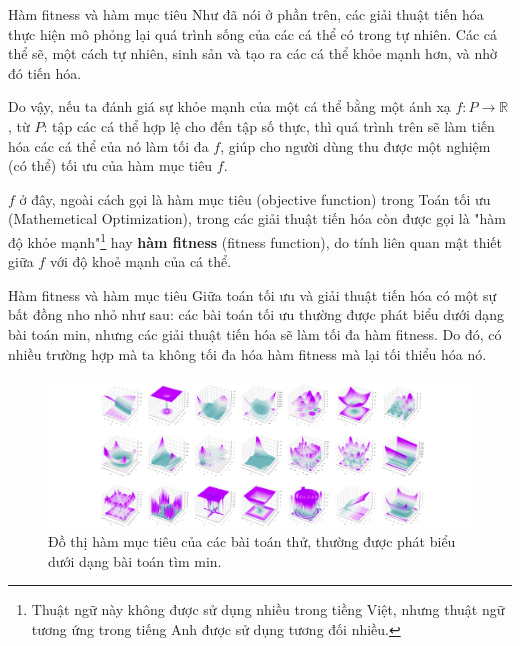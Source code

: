 \begin{frame}{Hàm fitness và hàm mục tiêu}
Như đã nói ở phần trên, các giải thuật tiến hóa thực hiện mô phỏng lại quá trình
sống của các cá thể có trong tự nhiên. Các cá thể sẽ, một cách tự nhiên, 
sinh sản và tạo ra các cá thể khỏe mạnh hơn, và nhờ đó tiến hóa.

Do vậy, nếu ta đánh giá sự khỏe mạnh của một cá thể bằng một ánh xạ $f: P \to
\mathbb{R}$, từ $P$: tập các cá thể hợp lệ cho đến tập số thực, thì quá
trình trên sẽ làm tiến hóa các cá thể của nó làm tối đa $f$, giúp cho người dùng
thu được một nghiệm (có thể) tối ưu của hàm mục tiêu $f$.

$f$ ở đây, ngoài cách gọi là hàm mục tiêu (objective function) trong Toán tối ưu
(Mathemetical Optimization), trong các giải thuật tiến hóa còn được gọi là "hàm
độ khỏe mạnh"\footnote
{Thuật ngữ này không được sử dụng nhiều trong tiềng Việt,
nhưng thuật ngữ tương ứng trong tiếng Anh được sử dụng tương đối nhiều.} hay 
\textbf{hàm fitness} (fitness function), do tính liên quan mật thiết giữa $f$
với độ khoẻ mạnh của cá thể.

\end{frame}

\begin{frame}{Hàm fitness và hàm mục tiêu}
Giữa toán tối ưu và giải thuật tiến hóa có một sự bất đồng nho nhỏ như sau: các
bài toán tối ưu thường được phát biểu dưới dạng bài toán min, nhưng các giải
thuật tiến hóa sẽ làm tối đa hàm fitness. Do đó, có nhiều trường hợp mà ta không
tối đa hóa hàm fitness mà lại tối thiểu hóa nó.

\begin{figure}
\centering
\includegraphics[width=\textwidth, height=0.5\textheight, keepaspectratio]
{res/discrep.png}
\captionsetup{justification=centering,margin=3cm}
\caption{Đồ thị hàm mục tiêu của các bài toán thử, thường được phát biểu dưới
dạng bài toán tìm min.}
\end{figure}
\end{frame}

